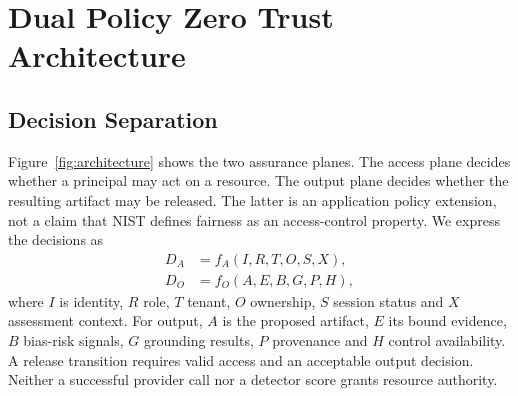 \documentclass[conference]{IEEEtran}
\begin{document}
\section{Dual Policy Zero Trust Architecture}
\subsection{Decision Separation}
Figure~\ref{fig:architecture} shows the two assurance planes. The access plane decides whether a principal may act on a resource. The output plane decides whether the resulting artifact may be released. The latter is an application policy extension, not a claim that NIST defines fairness as an access-control property. We express the decisions as
\begin{align}
D_A &= f_A(I,R,T,O,S,X), \\
D_O &= f_O(A,E,B,G,P,H),
\end{align}
where $I$ is identity, $R$ role, $T$ tenant, $O$ ownership, $S$ session status and $X$ assessment context. For output, $A$ is the proposed artifact, $E$ its bound evidence, $B$ bias-risk signals, $G$ grounding results, $P$ provenance and $H$ control availability. A release transition requires valid access and an acceptable output decision. Neither a successful provider call nor a detector score grants resource authority.
\end{document}
